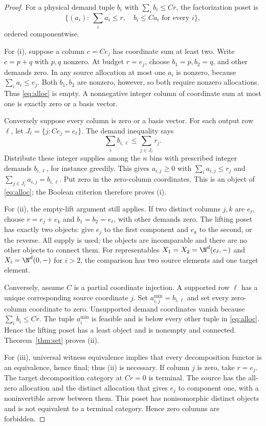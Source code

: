 \begin{proof}
For a physical demand tuple $b_i$ with $\sum_i b_i\leq Cr$, the
factorization poset is
\begin{equation}\label{eq:alloc}
 \{(a_i):\ \sum_i a_i\leq r,\quad b_i\leq Ca_i\text{ for every }i\},
\end{equation}
ordered componentwise.

For (i), suppose a column $c=Ce_j$ has coordinate sum at least two.
Write $c=p+q$ with $p,q$ nonzero. At budget $r=e_j$, choose
$b_1=p,b_2=q$, and other demands zero. In any source allocation at most
one $a_i$ is nonzero, because $\sum_i a_i\leq e_j$. Both $b_1,b_2$
are nonzero, however, so both require nonzero allocations. Thus
\eqref{eq:alloc} is empty. A nonnegative integer column of coordinate
sum at most one is exactly zero or a basis vector.

Conversely suppose every column is zero or a basis vector. For each
output row $\ell$, let $J_\ell=\{j:Ce_j=e_\ell\}$. The demand
inequality says
\[
 \sum_i b_{i,\ell}\leq\sum_{j\in J_\ell}r_j.
\]
Distribute these integer supplies among the $n$ bins with prescribed
integer demands $b_{i,\ell}$, for instance greedily. This gives
$a_{i,j}\geq0$ with $\sum_i a_{i,j}\leq r_j$ and
$\sum_{j\in J_\ell}a_{i,j}=b_{i,\ell}$. Put zero in the zero-column
coordinates. This is an object of \eqref{eq:alloc}; the Boolean criterion
therefore proves (i).

For (ii), the empty-lift argument still applies. If two distinct columns
$j,k$ are $e_\ell$, choose $r=e_j+e_k$ and
$b_1=b_2=e_\ell$, with other demands zero. The lifting poset has exactly
two objects: give $e_j$ to the first component and $e_k$ to the second,
or the reverse. All supply is used; the objects are incomparable and
there are no other objects to connect them. For representables
$X_1=X_2=\N^d(e_\ell,-)$ and $X_i=\N^d(0,-)$ for $i>2$, the
comparison has two source elements and one target element.

Conversely, assume $C$ is a partial coordinate injection. A supported
row $\ell$ has a unique corresponding source coordinate $j$. Set
$a^{\min}_{i,j}=b_{i,\ell}$ and set every zero-column coordinate to zero.
Unsupported demand coordinates vanish because $\sum_i b_i\leq Cr$.
The tuple $a_i^{\min}$ is feasible and is below every other tuple in
\eqref{eq:alloc}. Hence the lifting poset has a least object and is
nonempty and connected. Theorem~\ref{thm:set} proves (ii).

For (iii), universal witness equivalence implies that every decomposition
functor is an equivalence, hence final; thus (ii) is necessary. If column
$j$ is zero, take $r=e_j$. The target decomposition category at $Cr=0$
is terminal. The source has the all-zero allocation and the distinct
allocation that gives $e_j$ to component one, with a noninvertible arrow
between them. This poset has nonisomorphic distinct objects and is not
equivalent to a terminal category. Hence zero columns are forbidden.


\end{proof}
